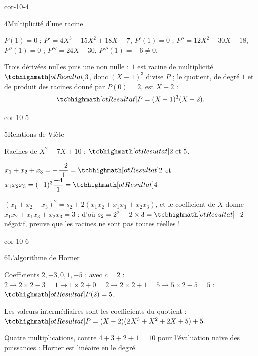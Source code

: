 \begin{blocLivre}{cor-10-4}
\begin{corrige}{4}{Multiplicité d'une racine}
\begin{questions}
  \item $P(1)=0$ ; $P'=4X^{3}-15X^{2}+18X-7$, $P'(1)=0$ ;
    $P''=12X^{2}-30X+18$, $P''(1)=0$ ; $P'''=24X-30$,
    $P'''(1)=-6\neq0$.
  \item Trois dérivées nulles puis une non nulle : $1$ est racine de
    multiplicité $\res{3}$, donc $(X-1)^{3}$ divise $P$ ; le quotient, de
    degré $1$ et de produit des racines donné par $P(0)=2$, est $X-2$ :
    \[
      \res{P=(X-1)^{3}(X-2)}.
    \]
\end{questions}
\end{corrige}
\end{blocLivre}

\begin{blocLivre}{cor-10-5}
\begin{corrige}{5}{Relations de Viète}
\begin{questions}
  \item Racines de $X^{2}-7X+10$ : $\res{2\text{ et }5}$.
  \item $x_1+x_2+x_3=-\dfrac{-2}{1}=\res{2}$ et
    $x_1x_2x_3=(-1)^{3}\dfrac{-4}{1}=\res{4}$.
  \item $(x_1+x_2+x_3)^{2}=s_2+2(x_1x_2+x_1x_3+x_2x_3)$, et le
    coefficient de $X$ donne $x_1x_2+x_1x_3+x_2x_3=3$ : d'où
    $s_2=2^{2}-2\times3=\res{-2}$ — négatif, preuve que les racines ne
    sont pas toutes réelles !
\end{questions}
\end{corrige}
\end{blocLivre}

\begin{blocLivre}{cor-10-6}
\begin{corrige}{6}{L'algorithme de Horner}
\begin{questions}
  \item Coefficients $2,-3,0,1,-5$ ; avec $c=2$ :
    $2\to2\times2-3=1\to1\times2+0=2\to2\times2+1=5\to5\times2-5=5$ :
    $\res{P(2)=5}$.
  \item Les valeurs intermédiaires sont les coefficients du quotient :
    $\res{P=(X-2)(2X^{3}+X^{2}+2X+5)+5}$.
  \item Quatre multiplications, contre $4+3+2+1=10$ pour l'évaluation
    naïve des puissances : Horner est linéaire en le degré.
\end{questions}
\end{corrige}
\end{blocLivre}

